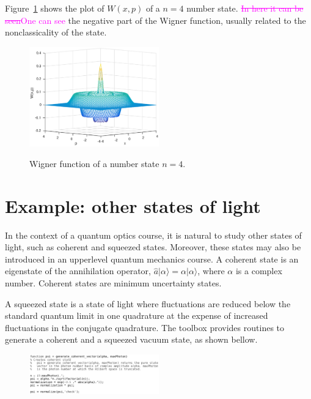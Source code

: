 \documentclass[twocolumn]{rbef}
\providecommand{\aucmnt}[1]{#1}
\providecommand{\editcolor}[2]{\textcolor{#1}{#2}}
\providecommand{\aucmnt}[1]{}
\providecommand{\editcolor}[2]{#2}
\newcommand{\SG}[1]{\editcolor{magenta}{#1}}
\newcommand{\SGs}[1]{\aucmnt{\editcolor{magenta}{\sout{#1}}}}
\begin{document}
Figure~\ref{fig-W-number4} shows the plot of $W(x,p)$ of a $n=4$
number state. \SGs{In here it can be seen}\SG{One can see} the negative part of the Wigner function, usually related to the nonclassicality of the state.
\begin{figure}[h]
\includegraphics[width=0.5\textwidth]{fockn=4.eps}
\label{fig-W-number4}
\caption{Wigner function of a number state $n=4$.}
\end{figure}

\section{Example: other states of light}
\label{other-states}
In the context of a quantum optics course, it is natural to study other states of light, such as coherent and squeezed states. Moreover, these states may also be introduced in an upperlevel quantum mechanics course. A coherent state is an eigenstate of the annihilation operator, $\hat{a}|\alpha\rangle = \alpha |\alpha\rangle$, where $\alpha$ is a complex number. Coherent states are minimum uncertainty states.

A squeezed state is a state of light where fluctuations are reduced below the standard quantum limit in one quadrature at the expense of increased fluctuations in the conjugate quadrature. The toolbox provides routines to generate a coherent and a squeezed vacuum state, as shown bellow.
\begin{figure}[h]
\includegraphics[width=0.5\textwidth]{generate_coherent_vector.eps}
\end{figure}
 
\end{document}
